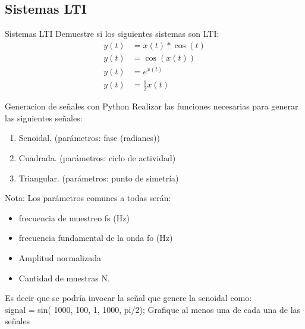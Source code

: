  \subsection{Sistemas LTI}
 \begin{frame}{Sistemas LTI}
 Demuestre si los siguientes sistemas son LTI:\\
 \begin{align*}
    y(t) &= x(t)*\cos{(t)} \\
    y(t) &= \cos(x(t)) \\
    y(t) &= e^{x(t)} \\
    y(t) &= \frac{1}{2}x(t)
 \end{align*}
    \vfill
 \end{frame}
 \begin{frame}{Generacion de señales con Python}
    Realizar las funciones necesarias para generar las siguientes señales:
    \begin{enumerate}
       \item {Senoidal. (parámetros: fase (radianes))}
       \item {Cuadrada. (parámetros: ciclo de actividad)}
       \item {Triangular. (parámetros: punto de simetría)}
    \end{enumerate}
    Nota: Los parámetros comunes a todas serán:
    \begin{itemize}
       \item {frecuencia de muestreo fs (Hz) }
       \item {frecuencia fundamental de la onda fo (Hz) }
       \item {Amplitud normalizada }
       \item {Cantidad de muestras N. }
    \end{itemize}
        Es decir que se podría invocar la señal que genere la senoidal como: \\
        signal = sin( 1000, 100, 1, 1000, pi/2);
        Grafique al menos una de cada una de las señales
    \vfill
 \end{frame}
